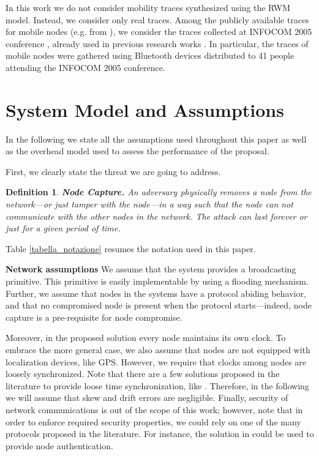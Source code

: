 \documentclass{IEEEconf}
\newtheorem{definition}[theorem]{Definition}
\begin{document}
In this work we do not consider mobility traces synthesized using the RWM model.
Instead, we consider only real traces.
Among the publicly available traces for mobile nodes (e.g. from \cite{CRAWDAD}), we consider the traces collected at INFOCOM 2005 conference \cite{CRAWDAD-INFOCOM}, already used in previous research works \cite{Hui:WDTN05,Chaintreau:CoNEXT07,Chuah:Simplex09,Tang:WOSN09}. In particular, the traces of mobile nodes were gathered using Bluetooth devices distributed to 41 people attending the INFOCOM 2005 conference.












\section{System Model and Assumptions}
\label{assumptions}

In the following we state all the assumptions used throughout this paper as well as the overhead model used to assess the performance of the proposal.

First, we clearly state the threat we are going to address.\begin{definition}
\textbf{Node Capture.}
An adversary physically removes a node from the network---or just tamper with the node---in a way such that the node can not communicate with the other nodes in the network. The attack can last forever or just for a given period of time.
\end{definition}

Table \ref{tabella_notazione} resumes the notation used in this paper.

{\bf Network assumptions}
We assume that the system provides a broadcasting primitive. This primitive is easily
implementable by using a flooding mechanism.
Further, we assume that nodes in the systems have a protocol abiding behavior, and that no compromised node is present when the protocol starts---indeed, node capture is a pre-requisite for node compromise.

Moreover, in the proposed solution every node maintains its own clock. To embrace the more general case, we also assume that nodes are not equipped with localization  devices, like GPS.
However, we require that clocks among nodes are loosely synchronized. Note that there are a few solutions proposed in the literature to provide loose time synchronization, like \cite{wsn_secure_synchro}.
Therefore, in the following we will assume that skew and drift errors are negligible.
Finally, security of network communications is out of the scope of this work; however, note that in order to enforce required security properties, we could rely on one of the many protocols proposed in the literature.
For instance, the solution in \cite{winet} could be used to provide node authentication.
\end{document}
